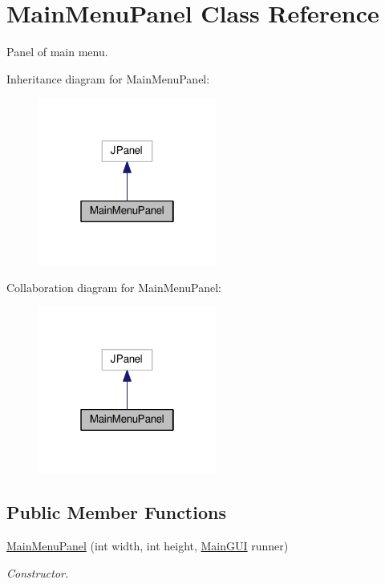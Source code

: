 \hypertarget{classMainMenuPanel}{}\section{Main\+Menu\+Panel Class Reference}
\label{classMainMenuPanel}


Panel of main menu.  




Inheritance diagram for Main\+Menu\+Panel\+:
\nopagebreak
\begin{figure}[H]
\begin{center}
\leavevmode
\includegraphics[width=166pt]{classMainMenuPanel__inherit__graph}
\end{center}
\end{figure}


Collaboration diagram for Main\+Menu\+Panel\+:
\nopagebreak
\begin{figure}[H]
\begin{center}
\leavevmode
\includegraphics[width=166pt]{classMainMenuPanel__coll__graph}
\end{center}
\end{figure}
\subsection*{Public Member Functions}
\begin{DoxyCompactItemize}
\item 
\hyperlink{classMainMenuPanel_a84d6e512c79963a1a77aaa48fa3c0211}{Main\+Menu\+Panel} (int width, int height, \hyperlink{classMainGUI}{Main\+G\+UI} runner)
\begin{DoxyCompactList}\small\item\em Constructor. \end{DoxyCompactList}\end{DoxyCompactItemize}
